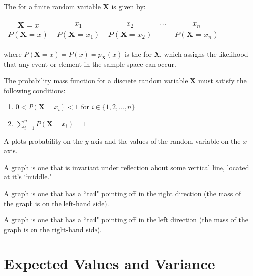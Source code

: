 \documentclass[12pt]{report}
\begin{document}
\begin{defn}{}{}
    The  for a finite random variable $\mathbf{X}$ is given by: 
    \begin{table}[H]
		\centering
		\begin{tabular}{|c|c|c|c|c|}
            \hline
		    $\mathbf{X} = x$ & $x_1$ & $x_2$ & $\hdots$ & $x_n$ \\\hline
            $P(\mathbf{X} = x)$ & $P(\mathbf{X} = x_1)$ & $P(\mathbf{X} = x_2)$ & $\hdots$ & $P(\mathbf{X} = x_n)$ \\\hline
        \end{tabular}
	\end{table}
    where $P(\mathbf{X} = x) = P(x) = p_{\mathbf{X}}(x)$ is the  for $\mathbf{X}$, which assigns the likelihood that any event or element in the sample space can occur.
\end{defn}

\begin{defn}{}{}
    The probability mass function for a discrete random variable $\mathbf{X}$ must satisfy the following conditions: \begin{enumerate}
        \item $0<P(\mathbf{X}=x_i)<1$ for $i \in \{1,2,...,n\}$
        \item $\sum\limits_{i=1}^nP(\mathbf{X}=x_i) = 1$
    \end{enumerate}
\end{defn}


\begin{defn}{}{}
    A  plots probability on the $y$-axis and the values of the random variable on the $x$-axis.

    A  graph is one that is invariant under reflection about some vertical line, located at it's ``middle."

    A  graph is one that has a ``tail" pointing off in the right direction (the mass of the graph is on the left-hand side).

    A  graph is one that has a ``tail" pointing off in the left direction (the mass of the graph is on the right-hand side).
\end{defn}

\section{Expected Values and Variance}
\end{document}
